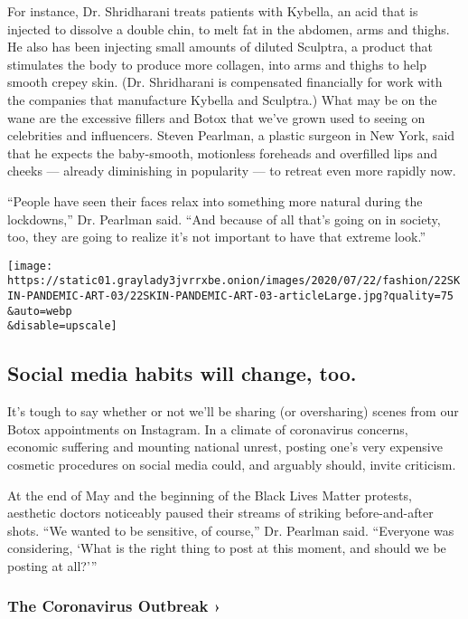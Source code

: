 For instance, Dr. Shridharani treats patients with Kybella, an acid that
is injected to dissolve a double chin, to melt fat in the abdomen, arms
and thighs. He also has been injecting small amounts of diluted
Sculptra, a product that stimulates the body to produce more collagen,
into arms and thighs to help smooth crepey skin. (Dr. Shridharani is
compensated financially for work with the companies that manufacture
Kybella and Sculptra.) What may be on the wane are the excessive fillers
and Botox that we've grown used to seeing on celebrities and
influencers. Steven Pearlman, a plastic surgeon in New York, said that
he expects the baby-smooth, motionless foreheads and overfilled lips and
cheeks --- already diminishing in popularity --- to retreat even more
rapidly now.

``People have seen their faces relax into something more natural during
the lockdowns,'' Dr. Pearlman said. ``And because of all that's going on
in society, too, they are going to realize it's not important to have
that extreme look.''

\texttt{[image: https://static01.graylady3jvrrxbe.onion/images/2020/07/22/fashion/22SKIN-PANDEMIC-ART-03/22SKIN-PANDEMIC-ART-03-articleLarge.jpg?quality=75\\\&auto=webp\\\&disable=upscale]}

\hypertarget{social-media-habits-will-change-too}{%
\subsection{Social media habits will change,
too.}\label{social-media-habits-will-change-too}}

It's tough to say whether or not we'll be sharing (or oversharing)
scenes from our Botox appointments on Instagram. In a climate of
coronavirus concerns, economic suffering and mounting national unrest,
posting one's very expensive cosmetic procedures on social media could,
and arguably should, invite criticism.

At the end of May and the beginning of the Black Lives Matter protests,
aesthetic doctors noticeably paused their streams of striking
before-and-after shots. ``We wanted to be sensitive, of course,'' Dr.
Pearlman said. ``Everyone was considering, `What is the right thing to
post at this moment, and should we be posting at all?'''

\href{https://www.nytimes3xbfgragh.onion/news-event/coronavirus?action=click\&pgtype=Article\&state=default\&region=MAIN_CONTENT_3\&context=storylines_faq}{}

\hypertarget{the-coronavirus-outbreak-}{%
\subsubsection{The Coronavirus Outbreak
›}\label{the-coronavirus-outbreak-}}

